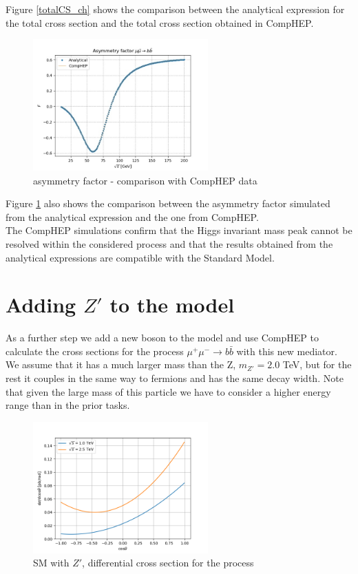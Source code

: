 \documentclass[12pt,letterpaper]{article}
\begin{document}
Figure \ref{totalCS_ch} shows the comparison between the analytical expression for the total cross section and the total cross section obtained in CompHEP.

\begin{figure}
\centering
\includegraphics[width=0.6\textwidth]{figures/Asymmetry_CH.jpg}
\caption{asymmetry factor - comparison with CompHEP data}
\label{asymmetry_ch}
\end{figure}

Figure \ref{asymmetry_ch} also shows the comparison between the asymmetry factor simulated from the analytical expression and the one from CompHEP.\\

The CompHEP simulations confirm that the Higgs invariant mass peak cannot be resolved within the considered process and that the results obtained from the analytical expressions are compatible with the Standard Model.


\section{Adding $Z'$ to the model}

As a further step we add a new boson to the model and use CompHEP to calculate the cross sections for the process $\mu^+\mu^-\rightarrow b\bar{b}$ with this new mediator. 
We assume that it has a much larger mass than the Z, $m_{Z'} = 2.0$ TeV, but for the rest it couples in the same way to fermions and has the same decay width. Note that given the large mass of this particle we have to consider a higher energy range than in the prior tasks.\\

\begin{figure}[!ht]
\centering
\includegraphics[width=0.6\textwidth]{figures/Zprime_diffCS.png}
\caption{SM with $Z'$, differential cross section for the process}
\label{Z'_diff}
\end{figure}
\end{document}
